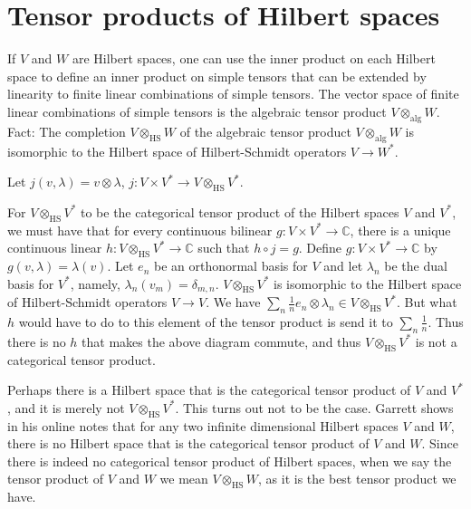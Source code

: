 \documentclass{article}
\begin{document}
\section{Tensor products of Hilbert spaces}
If $V$ and $W$ are Hilbert spaces,
one can use the inner product on each Hilbert
space to define an inner product on simple tensors that can be extended by linearity to finite linear combinations of simple tensors. The vector space of finite linear combinations of simple
tensors is the algebraic tensor product $V \otimes_{\textrm{alg}} W$.
Fact: 
The completion $V \otimes_{\textrm{HS}} W$ of the algebraic tensor product $V \otimes_{\textrm{alg}} W$ is isomorphic to the Hilbert space of Hilbert-Schmidt
operators $V \to W^*$. 



Let $j(v,\lambda)=v \otimes \lambda$, $j:V \times V^* \to V \otimes_{\textrm{HS}} V^*$. 


For $V \otimes_{\textrm{HS}} V^*$  to be the categorical tensor product of the Hilbert spaces $V$ and $V^*$, we must have that for every continuous bilinear $g:V \times V^* \to \mathbb{C}$, there is a unique
continuous linear $h: V \otimes_{\textrm{HS}} V^* \to \mathbb{C}$ such that $h \circ j = g$.  Define $g:V \times V^* \to \mathbb{C}$ by $g(v,\lambda)=\lambda(v)$. 
Let $e_n$ be an orthonormal basis for $V$ and let $\lambda_n$ be the dual basis for $V^*$, namely, $\lambda_n(v_m)=\delta_{m,n}$. $V \otimes_{\textrm{HS}} V^*$ is isomorphic
to the Hilbert space of Hilbert-Schmidt operators $V \to V$. We have $\sum_n \frac{1}{n} e_n \otimes \lambda_n \in V \otimes_{\textrm{HS}} V^*$. But
what $h$ would have to do to this element of the tensor product is send it to $\sum_n \frac{1}{n}$. Thus there is no $h$ that makes the above diagram commute,
and thus $V \otimes_{\textrm{HS}} V^*$ is not a categorical tensor product. 

Perhaps there is a Hilbert space that is the categorical tensor product of $V$ and $V^*$, and it is merely not $V \otimes_{\textrm{HS}} V^*$. This turns out not to be the case.
Garrett shows in his online notes that for any two infinite dimensional Hilbert spaces $V$ and $W$, there is no Hilbert space that is the categorical tensor
product of $V$ and $W$. Since there is indeed no categorical tensor product of Hilbert spaces, when we say the tensor product of $V$ and $W$ we mean $V \otimes_{\textrm{HS}} W$, as
it is the best tensor product we have.
\end{document}
